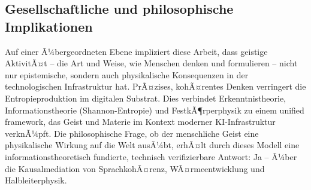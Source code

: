 ﻿\documentclass[a4paper,12pt]{article}
\theoremstyle{definition}
\begin{document}
\subsection{Gesellschaftliche und philosophische Implikationen}

Auf einer Ã¼bergeordneten Ebene impliziert diese Arbeit, dass geistige AktivitÃ¤t -- die
Art und Weise, wie Menschen denken und formulieren -- nicht nur epistemische, sondern
auch physikalische Konsequenzen in der technologischen Infrastruktur hat. PrÃ¤zises,
kohÃ¤rentes Denken verringert die Entropieproduktion im digitalen Substrat. Dies verbindet
Erkenntnistheorie, Informationstheorie (Shannon-Entropie) und FestkÃ¶rperphysik zu einem
unified framework, das Geist und Materie im Kontext moderner KI-Infrastruktur verknÃ¼pft.
Die philosophische Frage, ob der menschliche Geist eine physikalische Wirkung auf die
Welt ausÃ¼bt, erhÃ¤lt durch dieses Modell eine informationstheoretisch fundierte,
technisch verifizierbare Antwort: Ja -- Ã¼ber die Kausalmediation von SprachkohÃ¤renz,
WÃ¤rmeentwicklung und Halbleiterphysik.
\end{document}
